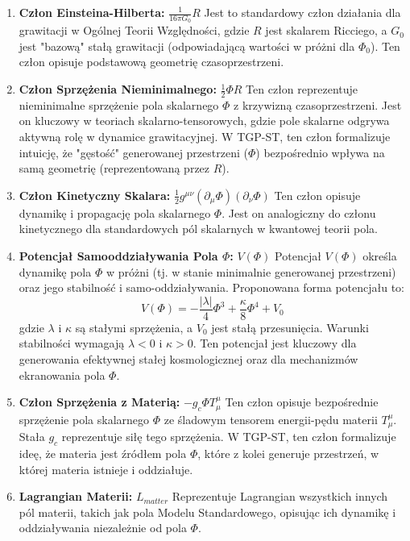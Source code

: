 \documentclass[11pt,a4paper]{article}
\begin{document}
\begin{enumerate}
    \item \textbf{Człon Einsteina-Hilberta:} $\frac{1}{16\pi G_0}R$
    Jest to standardowy człon działania dla grawitacji w Ogólnej Teorii Względności, gdzie $R$ jest skalarem Ricciego, a $G_0$ jest "bazową" stałą grawitacji (odpowiadającą wartości w próżni dla $\Phi_0$). Ten człon opisuje podstawową geometrię czasoprzestrzeni.

    \item \textbf{Człon Sprzężenia Nieminimalnego:} $\frac{1}{2}\Phi R$
    Ten człon reprezentuje nieminimalne sprzężenie pola skalarnego $\Phi$ z krzywizną czasoprzestrzeni. Jest on kluczowy w teoriach skalarno-tensorowych, gdzie pole skalarne odgrywa aktywną rolę w dynamice grawitacyjnej. W TGP-ST, ten człon formalizuje intuicję, że "gęstość" generowanej przestrzeni ($\Phi$) bezpośrednio wpływa na samą geometrię (reprezentowaną przez $R$).

    \item \textbf{Człon Kinetyczny Skalara:} $\frac{1}{2}g^{\mu\nu}(\partial_\mu\Phi)(\partial_\nu\Phi)$
    Ten człon opisuje dynamikę i propagację pola skalarnego $\Phi$. Jest on analogiczny do członu kinetycznego dla standardowych pól skalarnych w kwantowej teorii pola.

    \item \textbf{Potencjał Samooddziaływania Pola $\Phi$:} $V(\Phi)$
    Potencjał $V(\Phi)$ określa dynamikę pola $\Phi$ w próżni (tj. w stanie minimalnie generowanej przestrzeni) oraz jego stabilność i samo-oddziaływania. Proponowana forma potencjału to:
    \begin{equation}
        V(\Phi) = -\frac{|\lambda|}{4}\Phi^3 + \frac{\kappa}{8}\Phi^4 + V_0
        \label{eq:ScalarPotential}
    \end{equation}
    gdzie $\lambda$ i $\kappa$ są stałymi sprzężenia, a $V_0$ jest stałą przesunięcia. Warunki stabilności wymagają $\lambda < 0$ i $\kappa > 0$. Ten potencjał jest kluczowy dla generowania efektywnej stałej kosmologicznej oraz dla mechanizmów ekranowania pola $\Phi$.

    \item \textbf{Człon Sprzężenia z Materią:} $-g_{c}\Phi T^\mu_\mu$
    Ten człon opisuje bezpośrednie sprzężenie pola skalarnego $\Phi$ ze śladowym tensorem energii-pędu materii $T^\mu_\mu$. Stała $g_{c}$ reprezentuje siłę tego sprzężenia. W TGP-ST, ten człon formalizuje ideę, że materia jest źródłem pola $\Phi$, które z kolei generuje przestrzeń, w której materia istnieje i oddziałuje.

    \item \textbf{Lagrangian Materii:} $L_{matter}$
    Reprezentuje Lagrangian wszystkich innych pól materii, takich jak pola Modelu Standardowego, opisując ich dynamikę i oddziaływania niezależnie od pola $\Phi$.

\end{enumerate}
\end{document}
